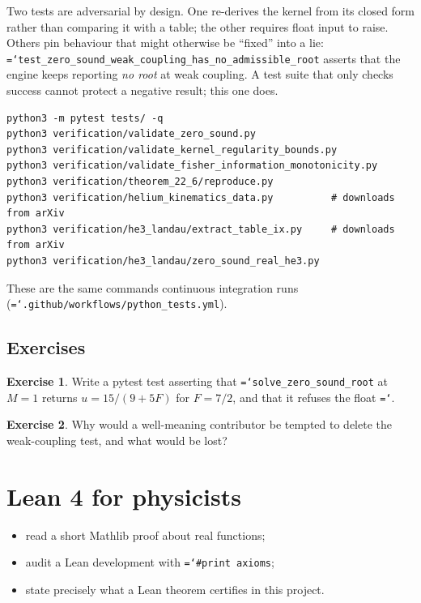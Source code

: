 \documentclass[11pt,a4paper,openany]{book}
\newcommand{\code}[1]{\texttt{\hyphenchar\font=`\-\relax #1}}
\theoremstyle{definition}
\newtheorem{exercise}{Exercise}[chapter]
\theoremstyle{plain}
\begin{document}
Two tests are adversarial by design. One re-derives the kernel from its closed form rather than
comparing it with a table; the other requires float input to raise. Others pin behaviour that
might otherwise be ``fixed'' into a lie: \code{test\_zero\_sound\_weak\_coupling\_has\_no\_admissible\_root}
asserts that the engine keeps reporting \emph{no root} at weak coupling. A test suite that only
checks success cannot protect a negative result; this one does.

\begin{runit}
\begin{verbatim}
python3 -m pytest tests/ -q
python3 verification/validate_zero_sound.py
python3 verification/validate_kernel_regularity_bounds.py
python3 verification/validate_fisher_information_monotonicity.py
python3 verification/theorem_22_6/reproduce.py
python3 verification/helium_kinematics_data.py          # downloads from arXiv
python3 verification/he3_landau/extract_table_ix.py     # downloads from arXiv
python3 verification/he3_landau/zero_sound_real_he3.py
\end{verbatim}
These are the same commands continuous integration runs
(\code{.github/workflows/python\_tests.yml}).
\end{runit}

\section*{Exercises}
\begin{exercise}\label{ex:newtest}
Write a pytest test asserting that \code{solve\_zero\_sound\_root} at $M=1$ returns
$u=15/(9+5F)$ for $F=7/2$, and that it refuses the float \code{3.5}.
\end{exercise}
\begin{exercise}\label{ex:negtest}
Why would a well-meaning contributor be tempted to delete the weak-coupling test, and what would be
lost?
\end{exercise}

\chapter{Lean 4 for physicists}
\label{ch:lean}

\begin{objectives}
\begin{itemize}
  \item read a short Mathlib proof about real functions;
  \item audit a Lean development with \code{\#print axioms};
  \item state precisely what a Lean theorem certifies in this project.
\end{itemize}
\end{objectives}
\end{document}
